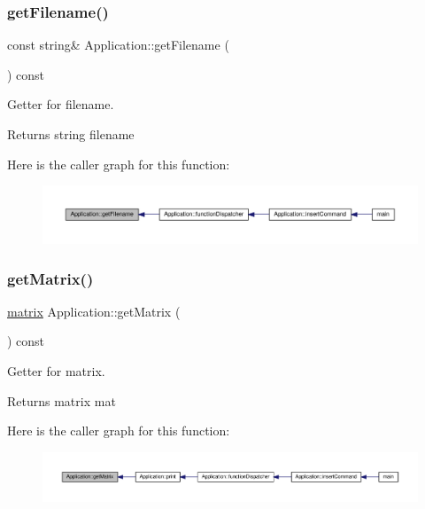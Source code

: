 \subsubsection{\texorpdfstring{get\+Filename()}{getFilename()}}
{\footnotesize\ttfamily const string\& Application\+::get\+Filename (\begin{DoxyParamCaption}{ }\end{DoxyParamCaption}) const\hspace{0.3cm}{\ttfamily [inline]}}

Getter for filename. \begin{DoxyReturn}{Returns}
string filename 
\end{DoxyReturn}
Here is the caller graph for this function\+:\nopagebreak
\begin{figure}[H]
\begin{center}
\leavevmode
\includegraphics[width=350pt]{class_application_a778575fb76de5352152d8928e1c3410f_icgraph}
\end{center}
\end{figure}
\mbox{\label{class_application_a67aeb617ca44a18045612d92f1d8afa0}} 
\subsubsection{\texorpdfstring{get\+Matrix()}{getMatrix()}}
{\footnotesize\ttfamily \hyperlink{formula_8h_a869e2a5deeb3daa4c82d6bc91cf20d92}{matrix} Application\+::get\+Matrix (\begin{DoxyParamCaption}{ }\end{DoxyParamCaption}) const\hspace{0.3cm}{\ttfamily [inline]}}

Getter for matrix. \begin{DoxyReturn}{Returns}
matrix mat 
\end{DoxyReturn}
Here is the caller graph for this function\+:\nopagebreak
\begin{figure}[H]
\begin{center}
\leavevmode
\includegraphics[width=350pt]{class_application_a67aeb617ca44a18045612d92f1d8afa0_icgraph}
\end{center}
\end{figure}
\mbox{\label{class_application_a2c6518d7f121299d9be8c66d31997fbc}} 
